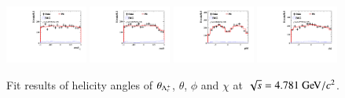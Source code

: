 \begin{figure}[H]\centering
    \includegraphics[width=0.24\textwidth]{figure/polarimetery/angular_plots/pkpi_4780_cos_theta0.pdf}
    \includegraphics[width=0.24\textwidth]{figure/polarimetery/angular_plots/pkpi_4780_cos_theta1.pdf}
    \includegraphics[width=0.24\textwidth]{figure/polarimetery/angular_plots/pkpi_4780_phi1.pdf}
    \includegraphics[width=0.24\textwidth]{figure/polarimetery/angular_plots/pkpi_4780_phi2.pdf}
    \caption{Fit results of helicity angles of $\theta_{\Lambda_{c}^{+}}$, $\theta$, $\phi$ and $\chi$ at $\sqrt{s} = 4.781\gev/c^2$.}
\label{fig:fit_angular_s9}
\end{figure}

